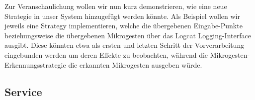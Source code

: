 Zur Veranschaulichung wollen wir nun kurz demonstrieren, wie eine neue Strategie in unser System hinzugefügt werden könnte. Als Beispiel wollen wir jeweils eine Strategy implementieren, welche die übergebenen Eingabe-Punkte beziehungsweise die übergebenen Mikrogesten über das Logcat Logging-Interface ausgibt. Diese könnten etwa als ersten und letzten Schritt der Vorverarbeitung eingebunden werden um deren Effekte zu beobachten, während die Mikrogesten-Erkennungsstrategie die erkannten Mikrogesten ausgeben würde.


\subsection{Service}\label{lbl_be_impl_service}



